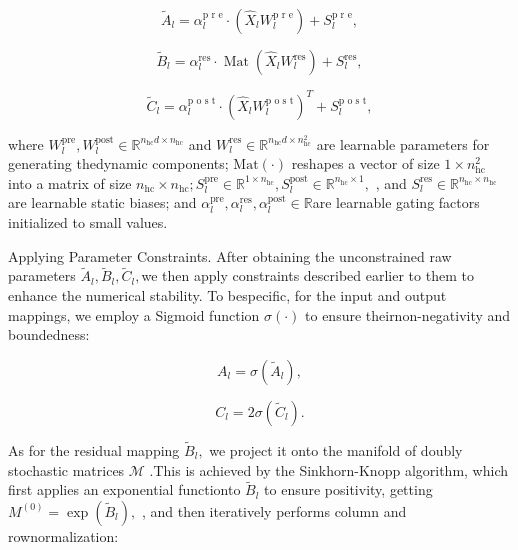 \documentclass[
  10
]{article}
\begin{document}
\[
\tilde {A} _ {l} = \alpha_ {l} ^ {\text {p r e}} \cdot \left(\hat {X} _ {l} W _ {l} ^ {\text {p r e}}\right) + S _ {l} ^ {\text {p r e}}, \tag {3}
\]

\[
\tilde {B} _ {l} = \alpha_ {l} ^ {\mathrm {r e s}} \cdot \operatorname {M a t} \left(\hat {X} _ {l} W _ {l} ^ {\mathrm {r e s}}\right) + S _ {l} ^ {\mathrm {r e s}}, \tag {4}
\]

\[
\tilde {C} _ {l} = \alpha_ {l} ^ {\text {p o s t}} \cdot \left(\hat {X} _ {l} W _ {l} ^ {\text {p o s t}}\right) ^ {T} + S _ {l} ^ {\text {p o s t}}, \tag {5}
\]

where
\(W _ { l } ^ { \mathrm { p r e } } , W _ { l } ^ { \mathrm { p o s t } } \in \mathbb { R } ^ { n _ { \mathrm { h c } } d \times n _ { \mathrm { h c } } }\)
and
\(W _ { l } ^ { \mathrm { r e s } } \in \mathbb { R } ^ { n _ { \mathrm { h c } } d \times n _ { \mathrm { h c } } ^ { 2 } }\)
are learnable parameters for generating thedynamic components;
\(\mathrm { { M a t } ( \cdot ) }\) reshapes a vector of size
\(1 \times n _ { \mathrm { h c } } ^ { 2 }\) into a matrix of size
\(n _ { \mathrm { h c } } \times n _ { \mathrm { h c } } ;\)\(S _ { l } ^ { \mathrm { p r e } } \in \mathbb { R } ^ { 1 \times n _ { \mathrm { h c } } } , S _ { l } ^ { \mathrm { p o s t } } \in \mathbb { R } ^ { n _ { \mathrm { h c } } \times 1 } ,\)
, and
\(S _ { l } ^ { \mathrm { r e s } } \in \mathbb { R } ^ { n _ { \mathrm { h c } } \times n _ { \mathrm { h c } } }\)
are learnable static biases; and
\(\alpha _ { l } ^ { \mathrm { p r e } } , \alpha _ { l } ^ { \mathrm { r e s } } , \alpha _ { l } ^ { \mathrm { p o s t } } \in \mathbb { R }\)are
learnable gating factors initialized to small values.

Applying Parameter Constraints. After obtaining the unconstrained raw
parameters
\(\tilde { A } _ { l } , \tilde { B } _ { l } , \tilde { C } _ { l } ,\)we
then apply constraints described earlier to them to enhance the
numerical stability. To bespecific, for the input and output mappings,
we employ a Sigmoid function \(\sigma ( \cdot )\) to ensure
theirnon-negativity and boundedness:

\[
A _ {l} = \sigma (\tilde {A} _ {l}), \tag {6}
\]

\[
C _ {l} = 2 \sigma (\tilde {C} _ {l}). \tag {7}
\]

As for the residual mapping \({ \tilde { B } } _ { l } ,\) we project it
onto the manifold of doubly stochastic matrices \(\mathcal { M }\) .This
is achieved by the Sinkhorn-Knopp algorithm, which first applies an
exponential functionto \(\tilde { B } _ { l }\) to ensure positivity,
getting \(M ^ { ( 0 ) } = \exp ( \tilde { B } _ { l } ) ,\) , and then
iteratively performs column and rownormalization:
\end{document}
